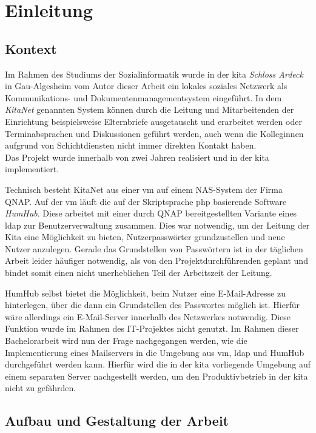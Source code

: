 

\chapter{Einleitung}
\label{sec:Einleitung}
\section{Kontext}
Im Rahmen des Studiums der Sozialinformatik wurde in der \ac{kita} \textit{Schloss Ardeck} in Gau-Algesheim vom Autor dieser Arbeit ein lokales soziales Netzwerk als Kommunikations- und Dokumentenmanagementsystem eingeführt. In dem \textit{KitaNet} genannten System können durch die Leitung und Mitarbeitenden der Einrichtung beispielsweise Elternbriefe ausgetauscht und erarbeitet werden oder Terminabsprachen und Diskussionen geführt werden, auch wenn die Kolleginnen aufgrund von Schichtdiensten nicht immer direkten Kontakt haben. \\ Das Projekt wurde innerhalb von zwei Jahren realisiert und in der \ac{kita} implementiert.

Technisch besteht KitaNet aus einer \ac{vm} auf einem NAS-System der Firma QNAP. Auf der \ac{vm} läuft die auf der Skriptsprache \ac{php} basierende Software \textit{HumHub}. Diese arbeitet mit einer durch QNAP bereitgestellten Variante eines \ac{ldap} zur Benutzerverwaltung zusammen. Dies war notwendig, um der Leitung der Kita eine Möglichkeit zu bieten, Nutzerpasswörter grundzustellen und neue Nutzer anzulegen. Gerade das Grundstellen von Passwörtern ist in der täglichen Arbeit leider häufiger notwendig, als von den Projektdurchführenden geplant und bindet somit einen nicht unerheblichen Teil der Arbeitszeit der Leitung.

HumHub selbst bietet die Möglichkeit, beim Nutzer eine E-Mail-Adresse zu hinterlegen, über die dann ein Grundstellen des Passwortes möglich ist. Hierfür wäre allerdings ein E-Mail-Server innerhalb des Netzwerkes notwendig. Diese Funktion wurde im Rahmen des IT-Projektes nicht genutzt. Im Rahmen dieser Bachelorarbeit wird nun der Frage nachgegangen werden, wie die Implementierung eines Mailservers in die Umgebung aus \ac{vm}, \ac{ldap} und HumHub durchgeführt werden kann. Hierfür wird die in der \ac{kita} vorliegende Umgebung auf einem separaten Server nachgestellt werden, um den Produktivbetrieb in der \ac{kita} nicht zu gefährden.

\section{Aufbau und Gestaltung der Arbeit}

